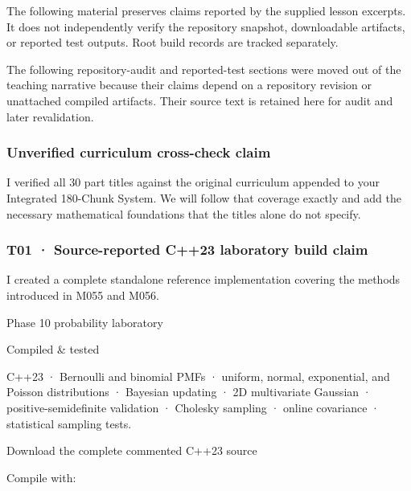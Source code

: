 \hypertarget{02-foundations-ii-ch039-supplied-source-claims-and-provenance-requiring-verification}{}

The following material preserves claims reported by the supplied lesson excerpts. It does not independently verify the repository snapshot, downloadable artifacts, or reported test outputs. Root build records are tracked separately.

The following repository-audit and reported-test sections were moved out of the teaching narrative because their claims depend on a repository revision or unattached compiled artifacts. Their source text is retained here for audit and later revalidation.

\subsubsection{Unverified curriculum cross-check claim}\label{02-foundations-ii-ch039-unverified-curriculum-cross-check-claim}

\hypertarget{02-foundations-ii-ch039-unverified-curriculum-cross-check-claim}{}

I verified all 30 part titles against the original curriculum appended to your Integrated 180-Chunk System. We will follow that coverage exactly and add the necessary mathematical foundations that the titles alone do not specify.

\subsubsection{T01 · Source-reported C++23 laboratory build claim}\label{02-foundations-ii-ch039-t01-source-reported-c23-laboratory-build-claim}

\hypertarget{02-foundations-ii-ch039-t01-source-reported-c23-laboratory-build-claim}{}

I created a complete standalone reference implementation covering the methods introduced in M055 and M056.

Phase 10 probability laboratory

Compiled \& tested

C++23 · Bernoulli and binomial PMFs · uniform, normal, exponential, and Poisson distributions · Bayesian updating · 2D multivariate Gaussian · positive-semidefinite validation · Cholesky sampling · online covariance · statistical sampling tests.

Download the complete commented C++23 source

Compile with:

